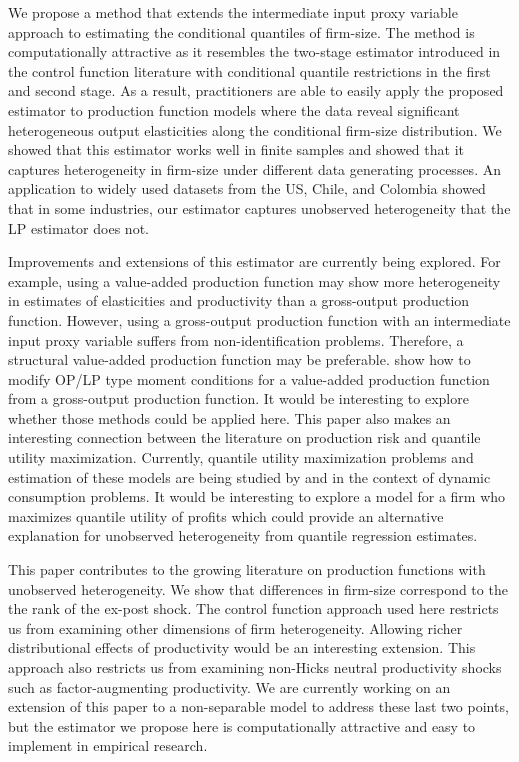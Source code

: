 \documentclass[11pt]{article}
\begin{document}
We propose a method that extends the intermediate input proxy variable approach to estimating the conditional quantiles of firm-size. The method is computationally attractive as it resembles the two-stage estimator introduced in the control function literature with conditional quantile restrictions in the first and second stage. As a result, practitioners are able to easily apply the proposed estimator to production function models where the data reveal significant heterogeneous output elasticities along the conditional firm-size distribution. We showed that this estimator works well in finite samples and showed that it captures heterogeneity in firm-size under different data generating processes. An application to widely used datasets from the US, Chile, and Colombia showed that in some industries, our estimator captures unobserved heterogeneity that the LP estimator does not.

Improvements and extensions of this estimator are currently being explored. For example, using a value-added production function may show more heterogeneity in estimates of elasticities and productivity than a gross-output production function. However, using a gross-output production function with an intermediate input proxy variable suffers from non-identification problems. Therefore, a structural value-added production function may be preferable. \cite{Kasahara2015} show how to modify OP/LP type moment conditions for a value-added production function from a gross-output production function. It would be interesting to explore whether those methods could be applied here. This paper also makes an interesting connection between the literature on production risk and quantile utility maximization. Currently, quantile utility maximization problems and estimation of these models are being studied by \cite{Castro2017} and \cite{qgmm} in the context of dynamic consumption problems. It would be interesting to explore a model for a firm who maximizes quantile utility of profits which could provide an alternative explanation for unobserved heterogeneity from quantile regression estimates.

This paper contributes to the growing literature on production functions with unobserved heterogeneity. We show that differences in firm-size correspond to the the rank of the ex-post shock. The control function approach used here restricts us from examining other dimensions of firm heterogeneity. Allowing richer distributional effects of productivity would be an interesting extension. This approach also restricts us from examining non-Hicks neutral productivity shocks such as factor-augmenting productivity. We are currently working on an extension of this paper to a non-separable model to address these last two points, but the estimator we propose here is computationally attractive and easy to implement in empirical research.    
\end{document}
